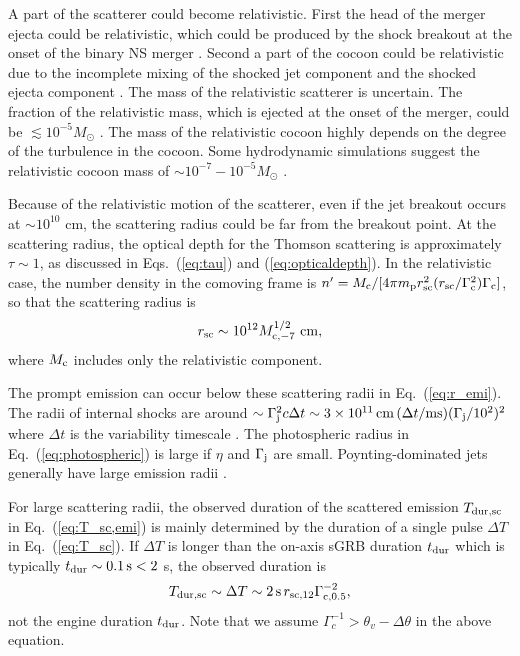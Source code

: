 \documentclass{emulateapj}
\begin{document}
A part of the scatterer could become relativistic.
First the head of the merger ejecta could be relativistic, which could be produced by
the shock breakout at the onset of the binary NS merger \citep{2014MNRAS.437L...6K}.
Second a part of the cocoon could be relativistic due to the incomplete mixing of 
the shocked jet component and the shocked ejecta component 
\citep[e.g., ][]{2017ApJ...834...28N, 2018MNRAS.473..576G, 2017ApJ...848L...6L}.
The mass of the relativistic scatterer is uncertain.
The fraction of the relativistic mass,
which is ejected at the onset of the merger, could be $\lesssim10^{-5}M_{\odot}$ \citep{2014MNRAS.437L...6K}.
The mass of the relativistic cocoon highly depends 
on the degree of the turbulence in the cocoon.
Some hydrodynamic simulations suggest the relativistic cocoon mass of $\sim10^{-7}-10^{-5}M_{\odot}$ 
\citep{2018MNRAS.473..576G, 2017ApJ...848L...6L}.

Because of the relativistic motion of the scatterer, 
even if the jet breakout occurs at $\sim10^{10}$ cm, 
the scattering radius could be far from the breakout point. 
At the scattering radius, the optical depth for the Thomson scattering is approximately
$\tau\sim1$, as discussed in Eqs.~(\ref{eq:tau}) and (\ref{eq:opticaldepth}).
In the relativistic case, the number density in the comoving frame is 
$n'=M_{\rm c}/[4\pi m_{\rm p}r_{\rm sc}^2(r_{\rm sc}/\Gamma_{\rm c}^2)\Gamma_{\rm c}]$, 
so that the scattering radius is
\begin{eqnarray}\label{eq:r_sc,rela}
r_{\rm sc}\sim10^{12}M_{\rm c,-7}^{1/2}~{\rm cm},
\end{eqnarray}
where $M_{\rm c}$ includes only the relativistic component. 

The prompt emission can occur below these scattering radii in Eq.~(\ref{eq:r_emi}).
The radii of internal shocks are around 
$\sim \Gamma_{\rm j}^2 c \Delta t 
\sim 3 \times 10^{11}\,{\rm cm}\,(\Delta t/{\rm ms})
(\Gamma_{\rm j}/10^2)^2$ where $\Delta t$ is the variability timescale 
\citep[e.g., ][]{1994ApJ...427..708P, 1994ApJ...430L..93R, 1997ApJ...490...92K}.
The photospheric radius in Eq.~(\ref{eq:photospheric}) is large 
if $\eta$ and $\Gamma_{\rm j}$ are small.
Poynting-dominated jets generally have large emission radii \citep[e.g., ][]{2005A&A...430....1G, 2015PhR...561....1K} \citep[but see also ][]{2017MNRAS.468.3202B}.

For large scattering radii,
the observed duration of the scattered emission $T_{\rm dur, sc}$ in Eq.~(\ref{eq:T_sc,emi})
is mainly determined by the duration of a single pulse $\Delta T$ in Eq.~(\ref{eq:T_sc}).
If $\Delta T$ is longer than the on-axis sGRB duration $t_{\rm dur}$ which is typically $t_{\rm dur} \sim 0.1\,{\rm s} < 2$ s,
the observed duration is 
\begin{eqnarray}\label{eq:T_sc,rela}
T_{\rm dur,sc} \sim\Delta T \sim 2\,{\rm s}\, r_{\rm sc,12} \Gamma_{\rm c,0.5}^{-2},
\end{eqnarray}
not the engine duration $t_{\rm dur}$.
Note that we assume $\Gamma_c^{-1}>\theta_v-\Delta \theta$ in the above equation.
\end{document}
